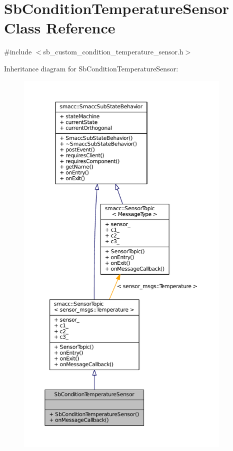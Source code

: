 \hypertarget{classSbConditionTemperatureSensor}{}\section{Sb\+Condition\+Temperature\+Sensor Class Reference}
\label{classSbConditionTemperatureSensor}


{\ttfamily \#include $<$sb\+\_\+custom\+\_\+condition\+\_\+temperature\+\_\+sensor.\+h$>$}



Inheritance diagram for Sb\+Condition\+Temperature\+Sensor\+:
\nopagebreak
\begin{figure}[H]
\begin{center}
\leavevmode
\includegraphics[height=550pt]{classSbConditionTemperatureSensor__inherit__graph}
\end{center}
\end{figure}


